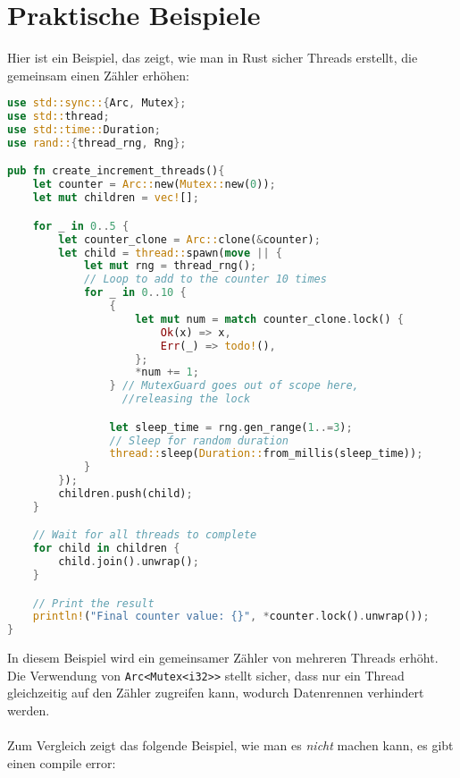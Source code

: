 \cleardoublepage
\section{Praktische Beispiele}

Hier ist ein Beispiel, das zeigt, wie man in Rust sicher Threads erstellt, die gemeinsam einen Zähler erhöhen:

\begin{lstlisting}[language=Rust, caption=Sicheres Erstellen von Threads mit Rust]
use std::sync::{Arc, Mutex};
use std::thread;
use std::time::Duration;
use rand::{thread_rng, Rng}; 

pub fn create_increment_threads(){
    let counter = Arc::new(Mutex::new(0));
    let mut children = vec![];

    for _ in 0..5 {
        let counter_clone = Arc::clone(&counter);
        let child = thread::spawn(move || {
            let mut rng = thread_rng(); 
            // Loop to add to the counter 10 times
            for _ in 0..10 { 
                {
                    let mut num = match counter_clone.lock() {
                        Ok(x) => x,
                        Err(_) => todo!(),
                    };
                    *num += 1;
                } // MutexGuard goes out of scope here, 
                  //releasing the lock

                let sleep_time = rng.gen_range(1..=3); 
                // Sleep for random duration
                thread::sleep(Duration::from_millis(sleep_time)); 
            }
        });
        children.push(child);
    }

    // Wait for all threads to complete
    for child in children {
        child.join().unwrap();
    }

    // Print the result
    println!("Final counter value: {}", *counter.lock().unwrap());
}
\end{lstlisting}
\noindent
In diesem Beispiel wird ein gemeinsamer Zähler von mehreren Threads erhöht. 
Die Verwendung von \texttt{Arc<Mutex<i32>>} stellt sicher, dass nur ein Thread gleichzeitig auf den Zähler zugreifen kann, wodurch Datenrennen verhindert werden.\\
\\
Zum Vergleich zeigt das folgende Beispiel, wie man es \emph{nicht} machen kann, es gibt einen compile error:

